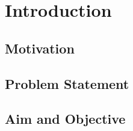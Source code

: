 \chapter{Introduction}

\section{Motivation}

\section{Problem Statement}

\section{Aim and Objective}

